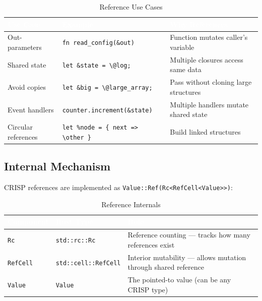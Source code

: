 \begin{table}[H]
\centering
{}
\caption{\textcolor{darkpurple}{Reference Use Cases}}
\vspace{0.3em}
\begin{tabular}{@{}llp{7cm}@{}}
\toprule
\rowcolor{softvioletdark}
\textbf{\textcolor{white}{Use Case}} & \textbf{\textcolor{white}{Example}} & \textbf{\textcolor{white}{Why References}} \\
\midrule
Out-parameters & \texttt{fn read\_config(\&out)} & Function mutates caller's variable \\
Shared state & \texttt{let \&state = \textbackslash @log;} & Multiple closures access same data \\
Avoid copies & \texttt{let \&big = \textbackslash @large\_array;} & Pass without cloning large structures \\
Event handlers & \texttt{counter.increment(\&state)} & Multiple handlers mutate shared state \\
Circular references & \texttt{let \%node = \{ next => \textbackslash other \}} & Build linked structures \\
\bottomrule
\end{tabular}
\end{table}

\subsection{Internal Mechanism}

CRISP references are implemented as \texttt{Value::Ref(Rc<RefCell<Value>>)}:

\begin{table}[H]
\centering
{}
\caption{\textcolor{darkpurple}{Reference Internals}}
\vspace{0.3em}
\begin{tabular}{@{}llp{7cm}@{}}
\toprule
\rowcolor{softvioletdark}
\textbf{\textcolor{white}{Component}} & \textbf{\textcolor{white}{Rust Type}} & \textbf{\textcolor{white}{Role}} \\
\midrule
\texttt{Rc} & \texttt{std::rc::Rc} & Reference counting — tracks how many references exist \\
\texttt{RefCell} & \texttt{std::cell::RefCell} & Interior mutability — allows mutation through shared reference \\
\texttt{Value} & \texttt{Value} & The pointed-to value (can be any CRISP type) \\
\bottomrule
\end{tabular}
\end{table}

